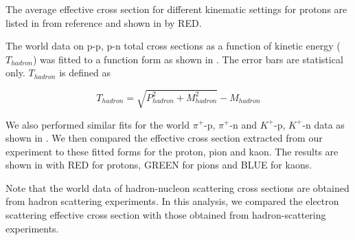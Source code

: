 %
\label{Effective cross-section of protons(p)}
The average effective cross section for different kinematic settings for protons are listed in  from reference\cite{carroll} and shown in  by RED.


%
The world data \cite{PDG} on p-p, p-n total cross sections as a function of kinetic energy ($T_{hadron}$) was fitted to a function form as shown in . The error bars are statistical only. $T_{hadron}$ is defined as 

\begin{equation} \label{equ:effective4}
T_{hadron} = \sqrt{P_{hadron}^2 + M_{hadron}^2} - M_{hadron}
\end{equation}

We also performed similar fits for the world $\pi^+$-p, $\pi^+$-n and $K^+$-p, $K^+$-n data as shown in . We then compared the effective cross section extracted from our experiment to these fitted forms for the proton, pion and kaon. The results are shown in  with RED for protons, GREEN for pions and BLUE for kaons. 


Note that the world data of hadron-nucleon scattering cross sections are obtained from hadron scattering experiments. In this analysis, we compared the electron scattering effective cross section with those obtained from hadron-scattering experiments.

